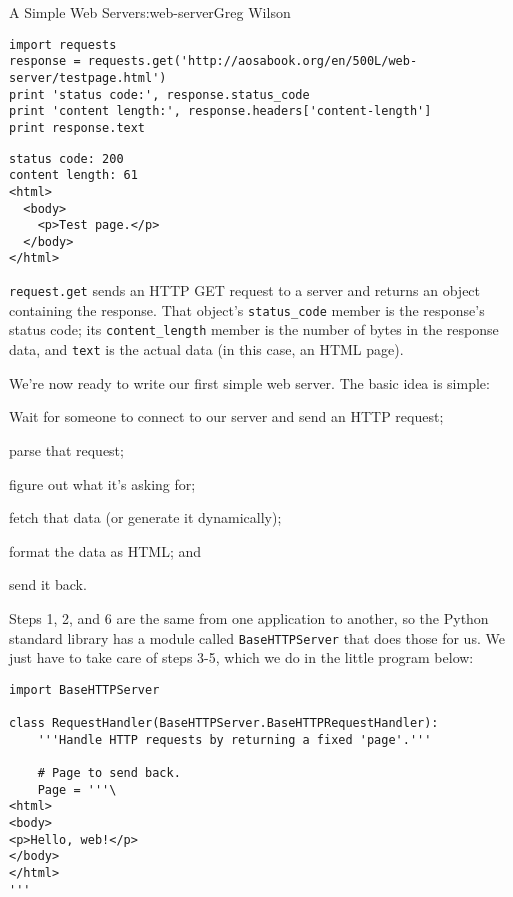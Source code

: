 \begin{aosachapter}{A Simple Web Server}{s:web-server}{Greg Wilson}
\begin{verbatim}
import requests
response = requests.get('http://aosabook.org/en/500L/web-server/testpage.html')
print 'status code:', response.status_code
print 'content length:', response.headers['content-length']
print response.text
\end{verbatim}

\begin{verbatim}
status code: 200
content length: 61
<html>
  <body>
    <p>Test page.</p>
  </body>
</html>
\end{verbatim}

\texttt{request.get} sends an HTTP GET request to a server and returns
an object containing the response. That object's \texttt{status\_code}
member is the response's status code; its \texttt{content\_length}
member is the number of bytes in the response data, and \texttt{text} is
the actual data (in this case, an HTML page).

\label{hello-web}

We're now ready to write our first simple web server. The basic idea is
simple:

\begin{aosaenumerate}
\def\labelenumi{\arabic{enumi}.}

\item
  Wait for someone to connect to our server and send an HTTP request;
\item
  parse that request;
\item
  figure out what it's asking for;
\item
  fetch that data (or generate it dynamically);
\item
  format the data as HTML; and
\item
  send it back.
\end{aosaenumerate}

Steps 1, 2, and 6 are the same from one application to another, so the
Python standard library has a module called \texttt{BaseHTTPServer} that
does those for us. We just have to take care of steps 3-5, which we do
in the little program below:

\begin{verbatim}
import BaseHTTPServer

class RequestHandler(BaseHTTPServer.BaseHTTPRequestHandler):
    '''Handle HTTP requests by returning a fixed 'page'.'''

    # Page to send back.
    Page = '''\
<html>
<body>
<p>Hello, web!</p>
</body>
</html>
'''


\end{verbatim}
\end{aosachapter}
